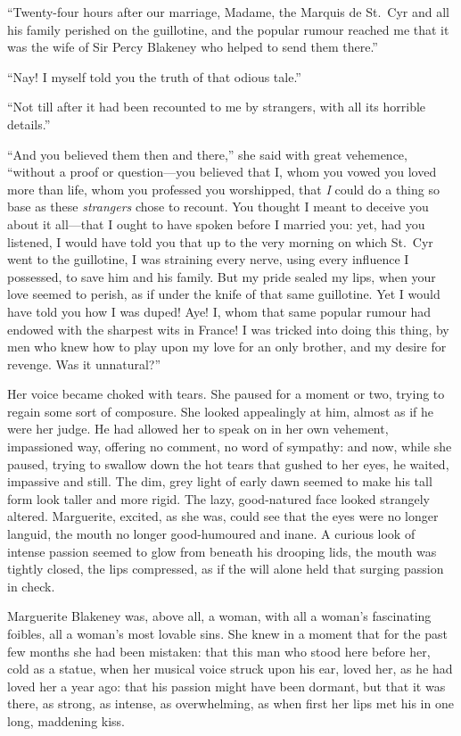 \documentclass[paper=5.5in:8.5in,BCOR=7mm,twoside,DIV=calc,12pt,usegeometry,chapterprefix,endperiod,headings=big]{scrbook}
\begin{document}
\enquote{Twenty-four hours after our marriage, Madame, the Marquis de St.~Cyr and all his family perished on the guillotine, and the popular rumour reached me that it was the wife of Sir Percy Blakeney who helped to send them there.}

\enquote{Nay! I myself told you the truth of that odious tale.}

\enquote{Not till after it had been recounted to me by strangers, with all its horrible details.}

\enquote{And you believed them then and there,} she said with great vehemence, \enquote{without a proof or question---you believed that I, whom you vowed you loved more than life, whom you professed you worshipped, that \textit{I} could do a thing so base as these \textit{strangers} chose to recount. You thought I meant to deceive you about it all---that I ought to have spoken before I married you: yet, had you listened, I would have told you that up to the very morning on which St.~Cyr went to the guillotine, I was straining every nerve, using every influence I possessed, to save him and his family. But my pride sealed my lips, when your love seemed to perish, as if under the knife of that same guillotine. Yet I would have told you how I was duped! Aye! I, whom that same popular rumour had endowed with the sharpest wits in France! I was tricked into doing this thing, by men who knew how to play upon my love for an only brother, and my desire for revenge. Was it unnatural?}

Her voice became choked with tears. She paused for a moment or two, trying to regain some sort of composure. She looked appealingly at him, almost as if he were her judge. He had allowed her to speak on in her own vehement, impassioned way, offering no comment, no word of sympathy: and now, while she paused, trying to swallow down the hot tears that gushed to her eyes, he waited, impassive and still. The dim, grey light of early dawn seemed to make his tall form look taller and more rigid. The lazy, good-natured face looked strangely altered. Marguerite, excited, as she was, could see that the eyes were no longer languid, the mouth no longer good-humoured and inane. A curious look of intense passion seemed to glow from beneath his drooping lids, the mouth was tightly closed, the lips compressed, as if the will alone held that surging passion in check.

Marguerite Blakeney was, above all, a woman, with all a woman's fascinating foibles, all a woman's most lovable sins. She knew in a moment that for the past few months she had been mistaken: that this man who stood here before her, cold as a statue, when her musical voice struck upon his ear, loved her, as he had loved her a year ago: that his passion might have been dormant, but that it was there, as strong, as intense, as overwhelming, as when first her lips met his in one long, maddening kiss.
\end{document}
